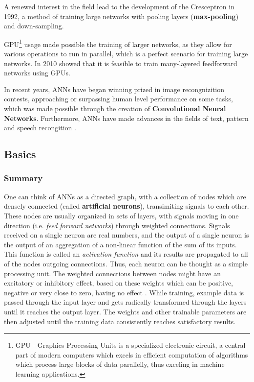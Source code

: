 A renewed interest in the field lead to the development of the
Cresceptron \cite{article:Cresceptron} in 1992, a method of training
large networks with pooling layers (\textbf{max-pooling}) and
down-sampling.

GPU\footnote{GPU - Graphics Processing Units is a
specialized electronic circuit, a central part of modern computers
which excels in efficient computation of algorithms which process
large blocks of data parallelly, thus exceling in machine learning
applications.} usage made possible the training of larger networks,
as they allow for various operations to run in parallel, which is
a perfect scenario for training large networks. In 2010 \citet{article:cire}
showed that it is feasible to train many-layered feedforward networks
using GPUs.

In recent years, ANNs have began winning prized in image recongnizition
contests, approaching or surpassing human level performance on some tasks,
which was made possible through the creation of \textbf{Convolutional Neural Networks}.
Furthermore, ANNs have made advances in the fields of text, pattern and speech recongition
\cite{graves2008offline}.

    \subsection{Basics}
    \subsubsection{Summary}

    One can think of ANNs as a directed graph, with a collection of nodes
    which are densely connected (called \textbf{artificial neurons}),
    transimiting signals to each other. These nodes are usually organized
    in sets of layers, with signals moving in one direction
    (i.e. \textit{feed forward networks}) through weighted connections.
    Signals received on a single neuron are real numbers, and the output
    of a single neuron is the output of an aggregation of a non-linear
    function of the sum of its inputs. This function is called an
    \textit{activation function} and its results are propagated to all of
    the nodes outgoing connections.  Thus, each neuron can be thought as a
    simple processing unit. The weighted connections between nodes might
    have an excitatory or inhibitory effect, based on these weights which
    can be positive, negative or very close to zero, having no effect
    \cite[Chap. ~ 1]{book:Gurney1997AnIT}. While training, example
    data is passed through the input layer and gets radically transformed
    through the layers until it reaches the output layer. The weights and
    other trainable parameters are then adjusted until the training data
    consistently reaches satisfactory results.

